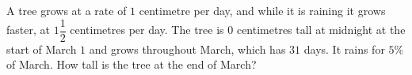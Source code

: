 A tree grows at a rate of $1$ centimetre per day, and while it is raining it grows faster, at $1\dfrac{1}{2}$ centimetres per day. The tree is $0$ centimetres tall at midnight at the start of March $1$ and grows throughout March, which has $31$ days. It rains for $5\%$ of March. How tall is the tree at the end of March?
